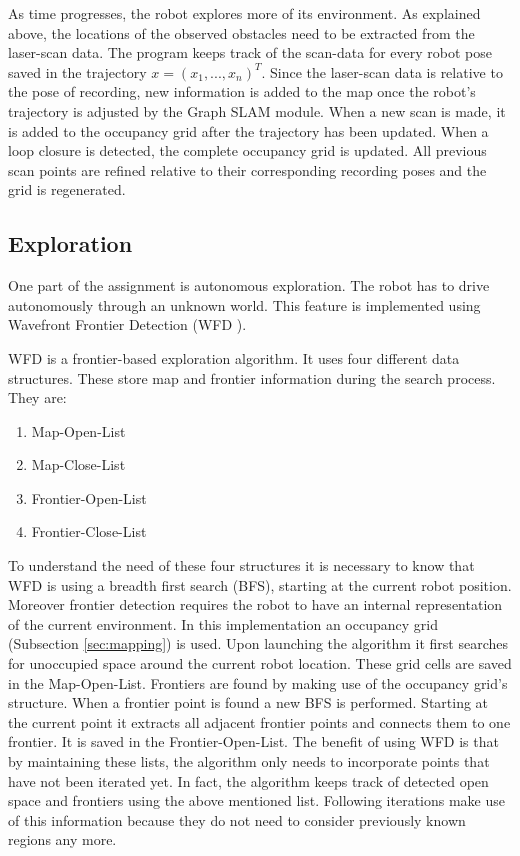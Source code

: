 \documentclass{ba-kecs}
\begin{document}
As time progresses, the robot explores more of its environment. As explained above, the locations of the observed obstacles need to be extracted from the laser-scan data. The program keeps track of the scan-data for every robot pose saved in the trajectory \(x = (x_1, ..., x_n)^T \). Since the laser-scan data is relative to the pose of recording, new information is added to the map once the robot's trajectory is adjusted by the Graph SLAM module. When a new scan is made, it is added to the occupancy grid after the trajectory has been updated. When a loop closure is detected, the complete occupancy grid is updated. All previous scan points are refined relative to their corresponding recording poses and the grid is regenerated.

\subsection{Exploration}
\label{sec:wfd}
One part of the assignment is autonomous exploration. The robot has to drive autonomously through an unknown world. This feature is implemented using Wavefront Frontier Detection (WFD \citep{Keidar}).

WFD is a frontier-based exploration algorithm. It uses four different data structures. These store map and frontier information during the search process. They are:
\begin{enumerate}
\item{Map-Open-List}
\item{Map-Close-List}
\item{Frontier-Open-List}
\item{Frontier-Close-List}
\end{enumerate}
To understand the need of these four structures it is necessary to know that WFD is using a breadth first search (BFS), starting at the current robot position. Moreover frontier detection requires the robot to have an internal representation of the current environment. In this implementation an occupancy grid (Subsection \ref{sec:mapping}) is used.
Upon launching the algorithm it first searches for unoccupied space around the current robot location. These grid cells are saved in the Map-Open-List. 
Frontiers are found by making use of the occupancy grid's structure. When a frontier point is found a new BFS is performed. Starting at the current point it extracts all adjacent frontier points and connects them to one frontier. It is saved in the Frontier-Open-List. The benefit of using WFD is that by maintaining these lists, the algorithm only needs to incorporate points that have not been iterated yet. In fact, the algorithm keeps track of detected open space and frontiers using the above mentioned list. Following iterations make use of this information because they do not need to consider previously known regions any more.
 
\end{document}
